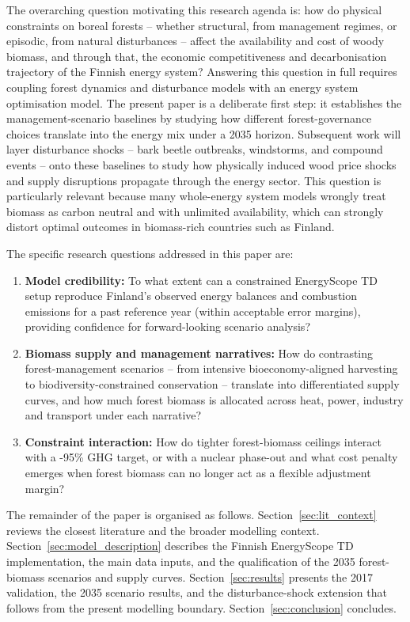 \documentclass{article}
\begin{document}
The overarching question motivating this research agenda is: how do physical constraints on boreal forests -- whether structural, from management regimes, or episodic, from natural disturbances -- affect the availability and cost of woody biomass, and through that, the economic competitiveness and decarbonisation trajectory of the Finnish energy system? Answering this question in full requires coupling forest dynamics and disturbance models with an energy system optimisation model. The present paper is a deliberate first step: it establishes the management-scenario baselines by studying how different forest-governance choices translate into the energy mix under a 2035 horizon. Subsequent work will layer disturbance shocks -- bark beetle outbreaks, windstorms, and compound events -- onto these baselines to study how physically induced wood price shocks and supply disruptions propagate through the energy sector. This question is particularly relevant because many whole-energy system models wrongly treat biomass as carbon neutral and with unlimited availability, which can strongly distort optimal outcomes in biomass-rich countries such as Finland.

The specific research questions addressed in this paper are:

\begin{enumerate}
  \item \textbf{Model credibility:} To what extent can a constrained EnergyScope TD setup reproduce Finland's observed energy balances and combustion emissions for a past reference year (within acceptable error margins), providing confidence for forward-looking scenario analysis?
  \item \textbf{Biomass supply and management narratives:} How do contrasting forest-management scenarios -- from intensive bioeconomy-aligned harvesting to biodiversity-constrained conservation -- translate into differentiated supply curves, and how much forest biomass is allocated across heat, power, industry and transport under each narrative?
  \item \textbf{Constraint interaction:} How do tighter forest-biomass ceilings interact with a -95\% GHG target, or with a nuclear phase-out and what cost penalty emerges when forest biomass can no longer act as a flexible adjustment margin?
\end{enumerate}

The remainder of the paper is organised as follows. Section~\ref{sec:lit_context} reviews the closest literature and the broader modelling context. Section~\ref{sec:model_description} describes the Finnish EnergyScope TD implementation, the main data inputs, and the qualification of the 2035 forest-biomass scenarios and supply curves. Section~\ref{sec:results} presents the 2017 validation, the 2035 scenario results, and the disturbance-shock extension that follows from the present modelling boundary. Section~\ref{sec:conclusion} concludes.
\end{document}
